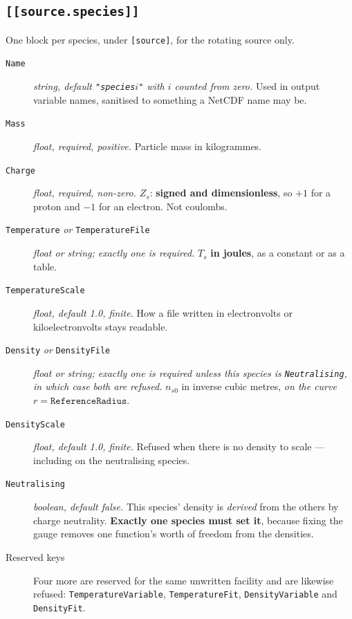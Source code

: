 \subsection{\texttt{[[source.species]]}}
\label{sec:species}

One block per species, under \texttt{[source]}, for the rotating source only.

\begin{description}

\item[\texttt{Name}] \emph{string, default \texttt{"species}$i$\texttt{"} with
	$i$ counted from zero.} Used in output variable names, sanitised to
	something a NetCDF name may be.

\item[\texttt{Mass}] \emph{float, required, positive.} Particle mass in
	kilogrammes.

\item[\texttt{Charge}] \emph{float, required, non-zero.} $Z_s$: \textbf{signed
	and dimensionless}, so $+1$ for a proton and $-1$ for an electron. Not
	coulombs.

\item[\texttt{Temperature} \emph{or} \texttt{TemperatureFile}] \emph{float or
	string; exactly one is required.} $T_s$ \textbf{in joules}, as a constant or
	as a table.

\item[\texttt{TemperatureScale}] \emph{float, default 1.0, finite.} How a file
	written in electronvolts or kiloelectronvolts stays readable.

\item[\texttt{Density} \emph{or} \texttt{DensityFile}] \emph{float or string;
	exactly one is required unless this species is \texttt{Neutralising}, in
	which case both are refused.} $n_{s0}$ in inverse cubic metres, \emph{on the
	curve} $r = \texttt{ReferenceRadius}$.

\item[\texttt{DensityScale}] \emph{float, default 1.0, finite.} Refused when
	there is no density to scale --- including on the neutralising species.

\item[\texttt{Neutralising}] \emph{boolean, default false.} This species'
	density is \emph{derived} from the others by charge neutrality.
	\textbf{Exactly one species must set it}, because fixing the gauge removes
	one function's worth of freedom from the densities.

\item[Reserved keys] Four more are reserved for the same unwritten facility
	and are likewise refused: \texttt{TemperatureVariable},
	\texttt{TemperatureFit}, \texttt{DensityVariable} and
	\texttt{DensityFit}.

\end{description}

